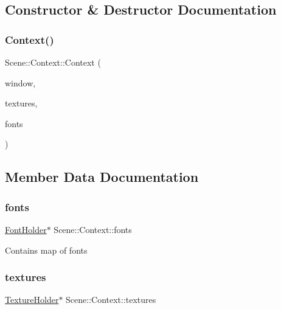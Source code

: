 \subsection{Constructor \& Destructor Documentation}
\mbox{\label{struct_scene_1_1_context_ac08956521e8de60178029d2fe236819b}} 
\subsubsection{\texorpdfstring{Context()}{Context()}}
{\footnotesize\ttfamily Scene\+::\+Context\+::\+Context (\begin{DoxyParamCaption}\item[{sf\+::\+Render\+Window \&}]{window,  }\item[{\hyperlink{_resource_identifiers_8h_a96220f9135333a0209f9367a28b7da13}{Texture\+Holder} \&}]{textures,  }\item[{\hyperlink{_resource_identifiers_8h_ac2733d29d4a4d26a739742097fc51ede}{Font\+Holder} \&}]{fonts }\end{DoxyParamCaption})}



\subsection{Member Data Documentation}
\mbox{\label{struct_scene_1_1_context_ae8a09bf6b99a1081940f2f2d73db0272}} 
\subsubsection{\texorpdfstring{fonts}{fonts}}
{\footnotesize\ttfamily \hyperlink{_resource_identifiers_8h_ac2733d29d4a4d26a739742097fc51ede}{Font\+Holder}$\ast$ Scene\+::\+Context\+::fonts}

Contains map of fonts \mbox{\label{struct_scene_1_1_context_a6ec97ee92bfa4d09abc6edc9508d0050}} 
\subsubsection{\texorpdfstring{textures}{textures}}
{\footnotesize\ttfamily \hyperlink{_resource_identifiers_8h_a96220f9135333a0209f9367a28b7da13}{Texture\+Holder}$\ast$ Scene\+::\+Context\+::textures}

